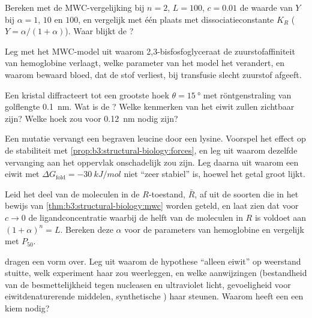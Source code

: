 \begin{exercise}[$\star\star$]\label{exo:b3:structural-biology:6}
Bereken met de MWC-vergelijking bij $n = 2$, $L = 100$, $c = 0.01$ de
waarde van $Y$ bij $\alpha = 1$, $10$ en $100$, en vergelijk met één
plaats met dissociatieconstante $K_{R}$ ($Y = \alpha/(1+\alpha)$). Waar
blijkt de ?
\end{exercise}

\begin{exercise}[$\star\star$]\label{exo:b3:structural-biology:7}
Leg met het MWC-model uit waarom 2,3-bisfosfoglyceraat de
zuurstofaffiniteit van hemoglobine verlaagt, welke parameter van het
model het verandert, en waarom bewaard bloed, dat de stof verliest, bij
transfusie slecht zuurstof afgeeft.
\end{exercise}

\begin{exercise}[$\star\star$]\label{exo:b3:structural-biology:8}
Een kristal diffracteert tot een grootste hoek $\theta = \qty{15}{\degree}$
met röntgenstraling van golflengte \qty{0.1}{nm}. Wat is de ?
Welke kenmerken van het eiwit zullen zichtbaar zijn? Welke hoek zou
voor \qty{0.12}{nm} nodig zijn?
\end{exercise}

\begin{exercise}[$\star\star$]\label{exo:b3:structural-biology:9}
Een mutatie vervangt een begraven leucine door een lysine. Voorspel het
effect op de stabiliteit met
\cref{prop:b3:structural-biology:forces}, en leg uit waarom dezelfde
vervanging aan het oppervlak onschadelijk zou zijn. Leg daarna uit
waarom een eiwit met $\Delta G_{\text{fold}} =
\qty{-30}{kJ/mol}$ niet ``zeer stabiel'' is, hoewel het getal groot
lijkt.
\end{exercise}

\begin{exercise}[$\star\star\star$]\label{exo:b3:structural-biology:10}
Leid het deel van de moleculen in de $R$-toestand, $\bar R$, af uit de
soorten die in het bewijs van \cref{thm:b3:structural-biology:mwc}
worden geteld, en laat zien dat voor $c \to 0$ de ligandconcentratie
waarbij de helft van de moleculen in $R$ is voldoet aan
$(1+\alpha)^{n} = L$. Bereken deze $\alpha$ voor de parameters van
hemoglobine en vergelijk met $P_{50}$.
\end{exercise}

\begin{exercise}[$\star\star\star$]\label{exo:b3:structural-biology:11}
 dragen een vorm over. Leg uit waarom de hypothese ``alleen
eiwit'' op weerstand stuitte, welk experiment haar zou weerleggen, en
welke aanwijzingen (bestandheid van de besmettelijkheid tegen nucleasen
en ultraviolet licht, gevoeligheid voor eiwitdenaturerende middelen,
synthetische ) haar steunen. Waarom heeft een  een kiem
nodig?
\end{exercise}

